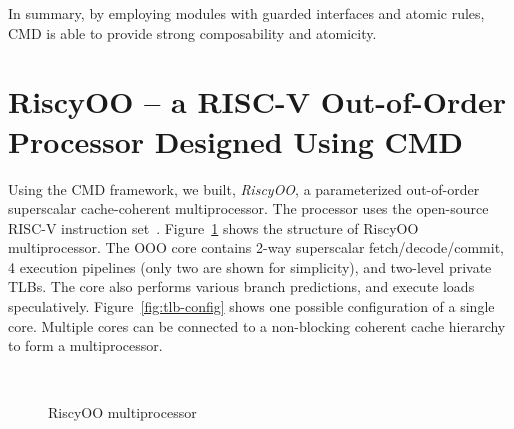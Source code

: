 \documentclass[conference]{IEEEtran}
\begin{document}
In summary, by employing modules with guarded interfaces and atomic rules, CMD is able to provide strong composability and atomicity.


\section{RiscyOO -- a RISC-V Out-of-Order Processor Designed Using CMD}\label{sec:ooo}
Using the CMD framework, we built, \emph{RiscyOO}, a parameterized out-of-order superscalar cache-coherent multiprocessor.
The processor uses the open-source RISC-V instruction set~\cite{riscv}.
Figure~\ref{fig:ooo} shows the structure of RiscyOO multiprocessor.
The OOO core contains 2-way superscalar fetch/decode/commit, 4 execution pipelines (only two are shown for simplicity), and two-level private TLBs.
The core also performs various branch predictions, and execute loads speculatively.
Figure~\ref{fig:tlb-config} shows one possible configuration of a single core.
Multiple cores can be connected to a non-blocking coherent cache hierarchy to form a multiprocessor.

\begin{figure}[!htb]
    \centering
    \\
    \caption{RiscyOO multiprocessor}\label{fig:ooo}
\end{figure}
\end{document}

